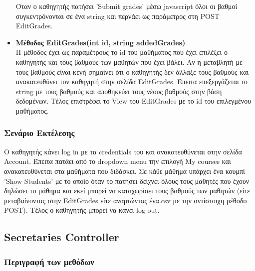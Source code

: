 \documentclass[12pt]{article}
\begin{document}
\begin{itemize}
	Όταν ο καθηγητής πατήσει 'Submit grades' μέσω javascript όλοι οι βαθμοί συγκεντρόνονται σε ένα string και περνάει ως παράμετρος στη POST EditGrades.
	
	\item \textbf{Μέθοδος EditGrades(int id, string addedGrades)}\\
	Η μέθοδος έχει ως παραμέτρους το id  του μαθήματος που έχει επιλέξει ο καθηγητής και τους βαθμούς των μαθητών που έχει βάλει. Αν η μεταβλητή με τους βαθμούς είναι κενή σημαίνει ότι ο καθηγητής δεν άλλαξε τους βαθμούς και ανακατευθύνει τον καθηγητή στην σελίδα EditGrades. Έπειτα επεξεργάζεται το string με τους βαθμούς και αποθηκεύει τους νέους βαθμούς στην βάση δεδομένων. Τέλος επιστρέφει το View του EditGrades με το id του επιλεγμένου μαθήματος.		
				
\end{itemize}

\subsubsection{Σενάριο Εκτέλεσης}
Ο καθηγητής κάνει log in με τα credentials του και ανακατευθύνεται στην σελίδα Account. Έπειτα πατάει από το dropdown menu την επιλογή My courses και ανακατευθύνεται στα μαθήματα που διδάσκει. Σε κάθε μάθημα υπάρχει ένα κουμπί 'Show Students' με το οποίο όταν το πατήσει δείχνει όλους τους μαθητές που έχουν δηλώσει το μάθημα και εκεί μπορεί να καταχωρίσει τους βαθμούς των μαθητών (είτε μεταβαίνοντας στην EditGrades είτε αναρτώντας ένα.csv με την αντίστοιχη μέθοδο POST). Τέλος ο καθηγητής μπορεί να κάνει log out.

\subsection{Secretaries Controller}



\subsubsection{Περιγραφή των μεθόδων}
\end{document}
